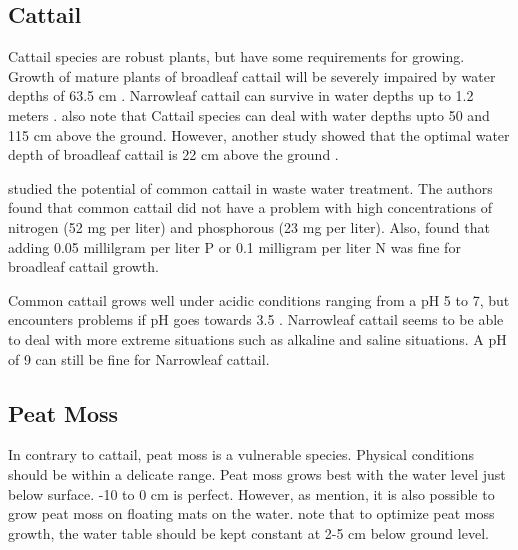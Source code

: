 \documentclass[a4paper,12pt]{scrbook}
\begin{document}
\subsection{Cattail}



Cattail species are robust plants, but have some requirements for growing. Growth of mature plants of broadleaf cattail will be severely impaired by water depths of 63.5 cm \citep{morton1975cattails}. Narrowleaf cattail can survive in water depths up to 1.2 meters \citep{morton1975cattails}. \citet{dubbe1988production} also note that Cattail species can deal with water depths upto 50 and 115 cm above the ground. However, another study showed that the optimal water depth of broadleaf cattail is 22 cm above the ground \citep{grace1989effects}.

\citet{ciria2005Typha} studied the potential of common cattail in waste water treatment. The authors found that common cattail did not have a problem with high concentrations of nitrogen (52 mg per liter) and phosphorous (23 mg per liter). Also, \citet{newman1996effects} found that adding 0.05 millilgram per liter P or 0.1 milligram per liter N was fine for broadleaf cattail growth.


Common cattail grows well under acidic conditions ranging from a pH 5 to 7, but encounters problems if pH goes towards 3.5 \citep{brix2002typha}. Narrowleaf cattail seems to be able to deal with more extreme situations such as alkaline and saline situations. A pH of 9 can still be fine for Narrowleaf cattail.



\subsection{Peat Moss}

In contrary to cattail, peat moss is a vulnerable species. Physical conditions should be within a delicate range. Peat moss grows best with the water level just below surface. -10 to 0 cm is perfect. However, as \citet{gaudig2014sphagnum} mention, it is also possible to grow peat moss on floating mats on the water. \citet{fritz2014paludicultuur} note that to optimize peat moss growth, the water table should be kept constant at 2-5 cm below ground level. 
\end{document}

